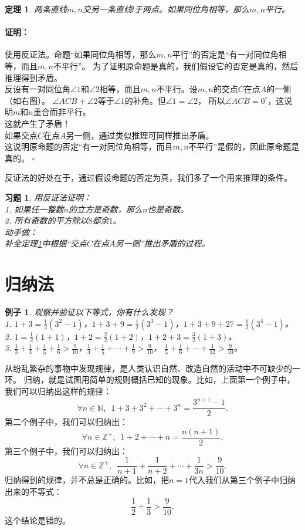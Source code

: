 \documentclass[12pt,UTF8]{ctexbook}
\newtheorem{tm}{定理}[section]
\newtheorem{ex}{例子}[section]
\newenvironment{proof2}{\paragraph{\textbf{证明：}}}{\hfill$\square$}
\newtheorem{xt}{习题}[section]
\begin{document}
\begin{tm}\label{tm:2-0-0}
    两条直线$m,n$交另一条直线$l$于两点。如果同位角相等，那么$m,n$平行。
\end{tm}
\begin{proof2}
    使用反证法。命题“如果同位角相等，那么$m,n$平行”的否定是“有一对同位角相等，而且$m,n$不平行”。
    为了证明原命题是真的，我们假设它的否定是真的，然后推理得到矛盾。\\
    反设有一对同位角$\angle 1$和$\angle 2$相等，而且$m,n$不平行。设$m,n$的交点$C$在点$A$的一侧（如右图）。
    $\angle ACB + \angle 2$等于$\angle 1$的补角。但$\angle 1 = \angle 2$，
    所以$\angle ACB = 0^\circ$，这说明$m$和$n$重合而非平行。\\
    这就产生了矛盾！\\
    如果交点$C$在点$A$另一侧，通过类似推理可同样推出矛盾。\\
    这说明原命题的否定“有一对同位角相等，而且$m,n$不平行”是假的，因此原命题是真的。
\end{proof2}

反证法的好处在于，通过假设命题的否定为真，我们多了一个用来推理的条件。

\begin{xt}
    用反证法证明：\\
    1. 如果任一整数$n$的立方是奇数，那么$n$也是奇数。\\
    2. 所有奇数的平方除以$8$都余$1$。\\
    动手做：\\
    补全定理\ref{tm:2-0-0}中根据“交点$C$在点$A$另一侧”推出矛盾的过程。
\end{xt}

\section{归纳法}
\begin{ex}\label{ex:2-2-0}
    观察并验证以下等式，你有什么发现？\\
    1. $1 + 3 = \frac12(3^2 - 1)$，$1 + 3 + 9 = \frac12(3^3 - 1)$，$1 + 3 + 9 + 27 = \frac12(3^4 - 1)$。\\
    2. $1 = \frac12(1+1)$，$1 + 2 = \frac22(1 + 2)$，$1 + 2 + 3 = \frac32(1 + 3)$。\\
    3. $\frac13 + \frac14 + \frac15 + \frac16 > \frac{9}{10}$，$\frac14 + \frac15 + \cdots + \frac{1}{9} > \frac{9}{10}$，
    $\frac15 + \frac16 + \cdots + \frac{1}{12} > \frac{9}{10}$。    
\end{ex}
从纷乱繁杂的事物中发现规律，是人类认识自然、改造自然的活动中不可缺少的一环。
归纳，就是试图用简单的规则概括已知的现象。比如，上面第一个例子中，我们可以归纳出这样的规律：
$$ \forall n \in \mathbb{N}, \,\,\, 1 + 3 + 3^2 + \cdots + 3^n = \frac{3^{n+1} - 1}{2}. $$
第二个例子中，我们可以归纳出：
$$ \forall n \in \mathbb{Z}^+, \,\,\, 1 + 2 + \cdots + n = \frac{n(n+1)}{2}. $$
第三个例子中，我们可以归纳出：
$$ \forall n \in \mathbb{Z}^+, \,\,\, \frac{1}{n+1} + \frac{1}{n+2} + \cdots + \frac{1}{3n} > \frac{9}{10}. $$
归纳得到的规律，并不总是正确的。比如，把$n=1$代入我们从第三个例子中归纳出来的不等式：
$$ \frac12 + \frac13 > \frac{9}{10}.$$
这个结论是错的。
\end{document}
